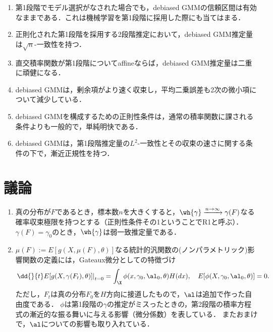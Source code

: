 \documentclass[uplatex,dvipdfmx]{jsreport}
\begin{document}
\begin{advantage}\mbox{}
    \begin{enumerate}
        \item 第1段階でモデル選択がなされた場合でも，debiased GMMの信頼区間は有効なままである．これは機械学習を第1段階に採用した際にも当てはまる．
        \item 正則化された第1段階を採用する2段階推定において，debiased GMM推定量は$\sqrt{n}$-一致性を持つ．
        \item 直交積率関数が第1段階についてaffineならば，debiased GMM推定量は二重に頑健になる．
        \item debiased GMMは，剰余項がより速く収束し，平均二乗誤差も2次の微小項について減少している．
        \item debiased GMMを構成するための正則性条件は，通常の積率関数に課される条件よりも一般的で，単純明快である．
        \item debiased GMMは，第1段階推定量の$L^2$-一致性とその収束の速さに関する条件の下で，漸近正規性を持つ．
    \end{enumerate}
\end{advantage}

\section{議論}

\begin{notation}\mbox{}
    \begin{enumerate}
        \item 真の分布が$F$であるとき，標本数$n$を大きくすると，$\wh{\gamma}\xrightarrow{n\to\infty}\gamma(F)$なる確率収束極限を持つとする（正則性条件その1ということでR1と呼ぶ）．$\gamma(F)=\gamma_0$のとき，$\wh{\gamma}$は弱一致推定量である．
        \item $\mu(F):=E[g(X,\mu(F),\theta)]$なる統計的汎関数の(ノンパラメトリック)影響関数の定義には，Gateaux微分としての特徴づけ
        \[\left.\dd{}{t}E[g(X,\gamma(F_t),\theta)]\right|_{t=0}=\int_\X\phi(x,\gamma_0,\al_0,\theta)H(dx),\quad E[\phi(X,\gamma_0,\al_0,\theta)]=0.\]
        ただし，$F_t$は真の分布$F_0$を$H$方向に接道したもので，$\al$は追加で作った自由度である．
        $\phi$は第1段階の$\gamma$の推定がミスったときの，第2段階の積率方程式の漸近的な振る舞いに与える影響（微分係数）を表している．
        またおまけで，$\al$についての影響も取り入れている．
    \end{enumerate}
\end{notation}
\end{document}
